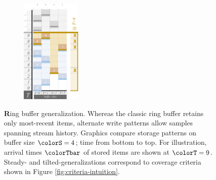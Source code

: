 \begin{figure}
\begin{minipage}{\linewidth}
\begin{subfigure}[t]{0.31\linewidth}
{\begin{minipage}[t]{\linewidth}
\includegraphics[height=2in, trim={1.33cm 0 0 0}, clip]{img/ring-buffer-tilted-serif-desat50}\\
\vspace{1ex}
\end{minipage}
}
\endgroup

\vspace{-0.2ex}
\centering
\begingroup\setlength{\fboxsep}{0pt}%
 \noindent{}\endgroup
\end{subfigure}
\end{minipage}

\caption{
  {\textbf Ring buffer generalization.}
  \footnotesize
  Whereas the classic ring buffer retains only most-recent items, alternate write patterns allow samples spanning stream history.
  Graphics compare storage patterns on buffer size $\colorS=4$; time from bottom to top.
  For illustration, arrival times $\colorTbar$ of stored items are shown at $\colorT=9$.
  Steady- and tilted-generalizations correspond to coverage criteria shown in Figure \ref{fig:criteria-intuition}.
}
\label{fig:curation-ingest-lookup}
\end{figure}
